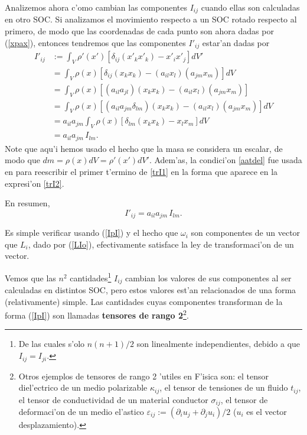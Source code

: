 Analizemos ahora c'omo cambian las componentes $I_{ij}$ cuando ellas son calculadas en otro SOC. Si analizamos el movimiento respecto a un SOC rotado respecto al primero, de modo que las coordenadas de cada punto son ahora dadas por (\ref{xpax}), entonces tendremos que las componentes $I'_{ij}$ estar'an dadas por
\begin{align}
I'_{ij} &:= \int_V\rho'(x')\left[\delta_{ij}(x'_kx'_k)-x'_i x'_j\right]dV'  \\
&= \int_V\rho(x)\left[\delta_{ij}(x_kx_k)-(a_{il}x_l)(a_{jm}x_m)\right]dV \label{trI1}\\
&= \int_V\rho(x)\left[(a_{il}a_{jl})(x_kx_k)-(a_{il}x_l)(a_{jm}x_m)\right] \label{trI2}\\
&= \int_V\rho(x)\left[(a_{il}a_{jm}\delta_{lm})(x_kx_k)-(a_{il}x_l)(a_{jm}x_m)\right]dV \\
&= a_{il}a_{jm}\int_V\rho(x)\left[\delta_{lm}(x_kx_k)-x_lx_m\right]dV \\
&= a_{il}a_{jm}\,I_{lm}.
\end{align}
Note que aqu'i hemos usado el hecho que la masa se considera un escalar, de modo que $dm=\rho(x)dV=\rho'(x')dV'$. Adem'as, la condici'on \eqref{aatdel} fue usada en para reescribir el primer t'ermino de \eqref{trI1} en la forma que aparece en la expresi'on \eqref{trI2}.

En resumen,
\begin{equation}\label{IpI}
I'_{ij} =a_{il}a_{jm}\,I_{lm}.
\end{equation}

Es simple verificar usando (\ref{IpI}) y el hecho que $\omega_i$ son componentes de un vector que $L_i$, dado por (\ref{LIo}), efectivamente satisface la ley de transformaci'on de un vector.

Vemos que las $n^2$ cantidades\footnote{De las cuales s'olo $n(n+1)/2$ son linealmente independientes, debido a que $I_{ij}=I_{ji}$.} $I_{ij}$ cambian los valores de sus componentes al ser calculadas en distintos SOC, pero estos valores est'an relacionados de una forma (relativamente) simple. Las cantidades cuyas componentes transforman de la forma (\ref{IpI}) son llamadas \textbf{tensores de rango 2}\footnote{Otros ejemplos de tensores de rango 2 'utiles en F'isica son: el tensor diel'ectrico de un medio polarizable $\kappa_{ij}$, el tensor de tensiones de un fluido $t_{ij}$, el tensor de conductividad de un material conductor $\sigma_{ij}$, el tensor de deformaci'on de un medio el'astico $\varepsilon_{ij}:=(\partial_i u_j+\partial_j u_i)/2$ ($u_i$ es el vector desplazamiento).}.

